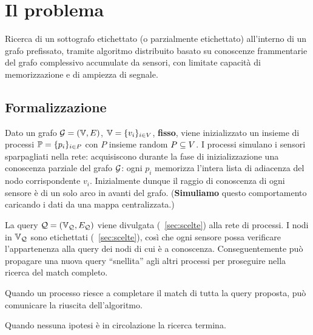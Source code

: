 \documentclass{article}
\begin{document}
%
\section{Il problema}
Ricerca di un sottografo etichettato (o parzialmente etichettato)
all'interno di un grafo prefissato, tramite algoritmo distribuito
basato su conoscenze frammentarie del grafo complessivo
accumulate da sensori, con limitate capacit\`a di memorizzazione
e di ampiezza di segnale.
%
%
\subsection{Formalizzazione}
Dato un grafo $\mathcal{G} = ( \mathbb{V}, E)$, $\mathbb{V} = \{v_i\}_{i \in V}$,
\textbf{fisso}, viene inizializzato un insieme di processi
$\mathbb{P} = \{p_i \}_{i \in P}$ con $P$ insieme random $P \subseteq V$.
I processi simulano i sensori sparpagliati nella rete:
acquisiscono durante la fase di inizializzazione una conoscenza
parziale del grafo $\mathcal{G}$: ogni $p_i$ memorizza l'intera lista di adiacenza
del nodo corrispondente $v_i$.
Inizialmente dunque il raggio di conoscenza di ogni sensore \`e
di un solo arco in avanti del grafo.
(\textbf{Simuliamo} questo comportamento caricando i dati da una mappa
centralizzata.)

La query $\mathcal{Q} = (\mathbb{V}_{\mathcal{Q}}, E_{\mathcal{Q}})$ viene divulgata (~\ref{sec:scelte})
alla rete di processi.
I nodi in $\mathbb{V}_{\mathcal{Q}}$ sono etichettati (~\ref{sec:scelte}),
cos\`i che ogni sensore possa verificare l'appartenenza alla query
dei nodi di cui \`e a conoscenza.
Conseguentemente pu\`o propagare una nuova query ``snellita'' agli altri
processi per proseguire nella ricerca del match completo.

Quando un processo riesce a completare il match di tutta la query proposta,
pu\`o comunicare la riuscita dell'algoritmo.

Quando nessuna ipotesi \`e in circolazione la ricerca termina.
\end{document}
